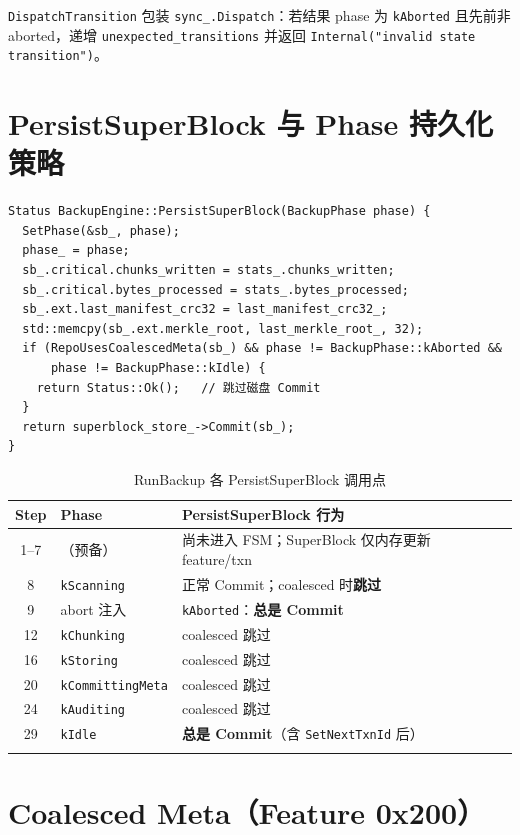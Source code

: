 \texttt{DispatchTransition} 包装 \texttt{sync\_.Dispatch}：若结果 phase 为 \texttt{kAborted} 且先前非 aborted，递增 \texttt{unexpected\_transitions} 并返回 \texttt{Internal("invalid state transition")}。

\section{PersistSuperBlock 与 Phase 持久化策略}
\label{sec:be-persist-sb}

\begin{lstlisting}[caption={PersistSuperBlock 核心逻辑},label={lst:persist-sb}]
Status BackupEngine::PersistSuperBlock(BackupPhase phase) {
  SetPhase(&sb_, phase);
  phase_ = phase;
  sb_.critical.chunks_written = stats_.chunks_written;
  sb_.critical.bytes_processed = stats_.bytes_processed;
  sb_.ext.last_manifest_crc32 = last_manifest_crc32_;
  std::memcpy(sb_.ext.merkle_root, last_merkle_root_, 32);
  if (RepoUsesCoalescedMeta(sb_) && phase != BackupPhase::kAborted &&
      phase != BackupPhase::kIdle) {
    return Status::Ok();   // 跳过磁盘 Commit
  }
  return superblock_store_->Commit(sb_);
}
\end{lstlisting}

\begin{longtable}{@{}cp{4.2cm}p{7.8cm}@{}}
\toprule
\textbf{Step} & \textbf{Phase} & \textbf{PersistSuperBlock 行为} \\
\midrule
\endhead
1--7 & （预备） & 尚未进入 FSM；SuperBlock 仅内存更新 feature/txn \\
8 & \texttt{kScanning} & 正常 Commit；coalesced 时\textbf{跳过} \\
9 & abort 注入 & \texttt{kAborted}：\textbf{总是 Commit} \\
12 & \texttt{kChunking} & coalesced 跳过 \\
16 & \texttt{kStoring} & coalesced 跳过 \\
20 & \texttt{kCommittingMeta} & coalesced 跳过 \\
24 & \texttt{kAuditing} & coalesced 跳过 \\
29 & \texttt{kIdle} & \textbf{总是 Commit}（含 \texttt{SetNextTxnId} 后） \\
\bottomrule
\caption{RunBackup 各 PersistSuperBlock 调用点}
\label{tab:persist-at-steps}
\end{longtable}

\section{Coalesced Meta（Feature 0x200）}
\label{sec:be-coalesced}

